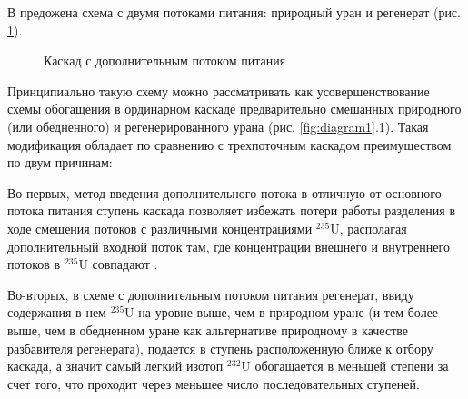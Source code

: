 В \cite{sulaberidzeQuasiidealCascadesAdditional2006} предожена схема с двумя потоками питания: природный уран и регенерат (рис. \ref{fig:2_inputs}).
\begin{figure}[ht]
  \caption{Каскад с дополнительным потоком питания}\label{fig:2_inputs}
\end{figure}

Принципиально такую схему можно рассматривать как усовершенствование схемы обогащения в ординарном каскаде предварительно смешанных природного (или обедненного) и регенерированного урана (рис. \ref{fig:diagram1}.1). Такая модификация обладает по сравнению с трехпоточным каскадом преимуществом по двум причинам:

Во-первых, метод введения дополнительного потока в отличную от основного потока питания ступень каскада позволяет избежать потери работы разделения в ходе смешения потоков с различными концентрациями $^{235}$U, располагая дополнительный входной поток там, где концентрации внешнего и внутреннего потоков в $^{235}$U совпадают \cite{smirnovKaskadnyeShemyZadachah2012, sulaberidzeQuasiidealCascadesAdditional2006}.

Во-вторых, в схеме с дополнительным потоком питания регенерат, ввиду содержания в нем $^{235}$U на уровне выше, чем в природном уране (и тем более выше, чем в обедненном уране как альтернативе природному в качестве разбавителя регенерата), подается в ступень расположенную ближе к отбору каскада, а значит самый легкий изотоп $^{232}$U обогащается в меньшей степени за счет того, что проходит через меньшее число последовательных ступеней.


